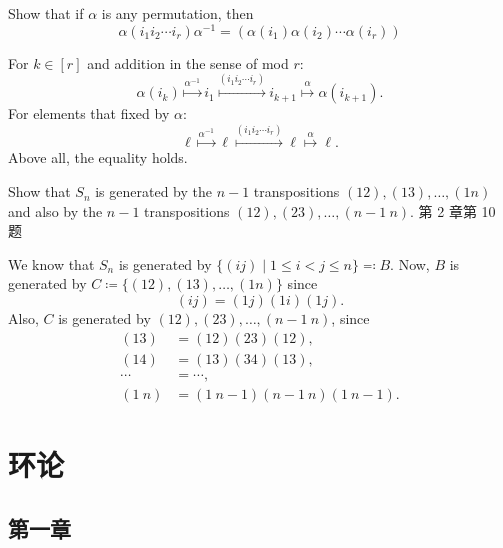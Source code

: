 \setcounter{pb}{17}
\begin{problem}
    Show that if $ \alpha $ is any permutation, then
    \[
    \alpha (i_1 i_2 \cdots i_r) \alpha^{-1} = (\alpha (i_1) \alpha (i_2) \cdots \alpha (i_r))
    \]
\end{problem}

\begin{solution}
    For $k\in[r]$ and addition in the sense of mod $r$:
        \[
            \alpha(i_{k})
            \overset{\alpha^{-1}}{\longmapsto} i_{1}
            \overset{(i_1 i_2 \cdots i_r)}{\longmapsto} i_{k+1}
            \overset{\alpha}{\longmapsto} \alpha(i_{k+1}).
        \]
    For elements that fixed by $\alpha$:
        \[
            \ell
            \overset{\alpha^{-1}}{\longmapsto} \ell
            \overset{(i_1 i_2 \cdots i_r)}{\longmapsto} \ell
            \overset{\alpha}{\longmapsto} \ell.
        \]
    Above all, the equality holds.
\end{solution}

\setcounter{pb}{18}
\begin{problem}
    Show that $ S_n $ is generated by the $ n-1 $ transpositions $ (12), (13), \dots, (1n) $ and also by 
    the $ n-1 $ transpositions $ (12), (23), \dots, (n-1\ n) $. 第 2 章第 10 题
\end{problem}

\begin{solution}
    We know that $S_{n}$ is generated by $\{(i j)\mid 1\leq i<j\leq n\}\eqqcolon B$. 
    Now, $B$ is generated by $C \coloneqq \{(12), (13), \dots, (1n)\}$ since
        \[
            (i j)=(1 j)(1 i)(1 j).
        \]
    Also, $C$ is generated by $ (12), (23), \dots, (n-1\ n) $, since
        \[
            \begin{split}
                (1 3) &=(1 2)(2 3)(1 2), \\
                (1 4) &=(1 3)(3 4)(1 3),\\
                \cdots &= \cdots, \\
                (1\ n) &=(1\ n-1)(n-1\ n)(1\ n-1).
            \end{split}
        \]
\end{solution}

\section{环论}
\subsection{第一章}
\setcounter{pb}{43}

